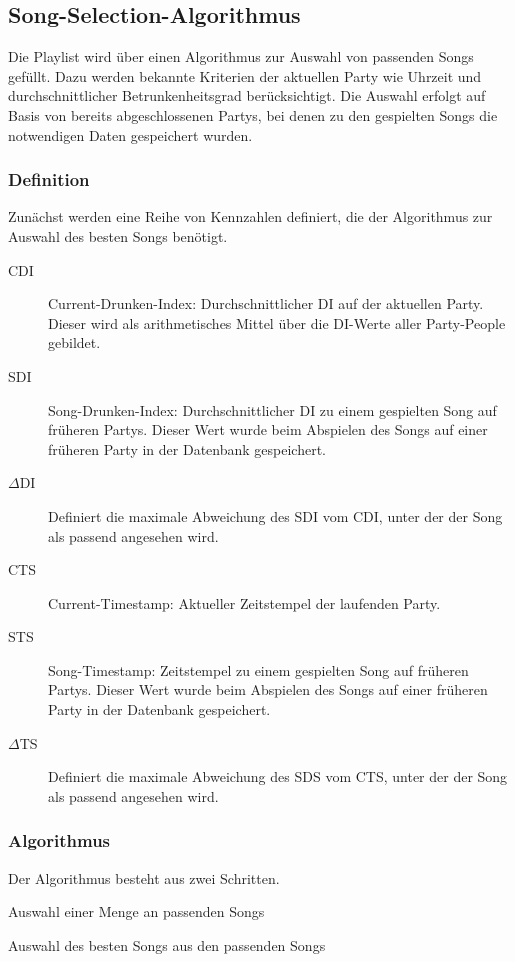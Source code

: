 \subsection{Song-Selection-Algorithmus}
\label{sec:SongSelect}
Die Playlist wird über einen Algorithmus zur Auswahl von passenden Songs gefüllt. Dazu werden bekannte Kriterien der aktuellen Party wie Uhrzeit und durchschnittlicher Betrunkenheitsgrad berücksichtigt. Die Auswahl erfolgt auf Basis von bereits abgeschlossenen Partys, bei denen zu den gespielten Songs die notwendigen Daten gespeichert wurden.

\subsubsection{Definition}
Zunächst werden eine Reihe von Kennzahlen definiert, die der Algorithmus zur Auswahl des besten Songs benötigt.

\begin{description}
	\item[CDI] Current-Drunken-Index: Durchschnittlicher DI auf der aktuellen Party. Dieser wird als arithmetisches Mittel über die DI-Werte aller Party-People gebildet.
	\item[SDI] Song-Drunken-Index: Durchschnittlicher DI zu einem gespielten Song auf früheren Partys. Dieser Wert wurde beim Abspielen des Songs auf einer früheren Party in der Datenbank gespeichert.
	\item[$\Delta$DI] Definiert die maximale Abweichung des SDI vom CDI, unter der der Song als passend angesehen wird.
	\item[CTS] Current-Timestamp: Aktueller Zeitstempel der laufenden Party.
	\item[STS] Song-Timestamp: Zeitstempel zu einem gespielten Song auf früheren Partys. Dieser Wert wurde beim Abspielen des Songs auf einer früheren Party in der Datenbank gespeichert.
	\item[$\Delta$TS] Definiert die maximale Abweichung des SDS vom CTS, unter der der Song als passend angesehen wird.
\end{description}

\subsubsection{Algorithmus}
Der Algorithmus besteht aus zwei Schritten.
\begin{compactenum}
	
	\item Auswahl einer Menge an passenden Songs
	\item Auswahl des besten Songs aus den passenden Songs
\end{compactenum}


